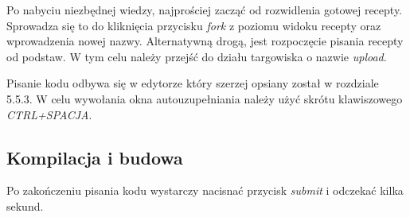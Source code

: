 \documentclass[11pt,a4paper,polish,thesis]{dcsbook}
\begin{document}
Po nabyciu niezbędnej wiedzy, najprościej zacząć od rozwidlenia gotowej recepty. Sprowadza się to do kliknięcia przycisku \emph{fork} z poziomu widoku recepty oraz
wprowadzenia nowej nazwy. Alternatywną drogą, jest rozpoczęcie pisania recepty od podstaw. W tym celu należy przejść do działu targowiska o nazwie \emph{upload}.

Pisanie kodu odbywa się w edytorze który szerzej opsiany został w rozdziale 5.5.3. W celu wywołania okna autouzupełniania należy użyć skrótu klawiszowego
\emph{CTRL+SPACJA}.
\subsection{Kompilacja i budowa}
Po zakończeniu pisania kodu wystarczy nacisnać przycisk \emph{submit} i odczekać kilka sekund.
\end{document}
